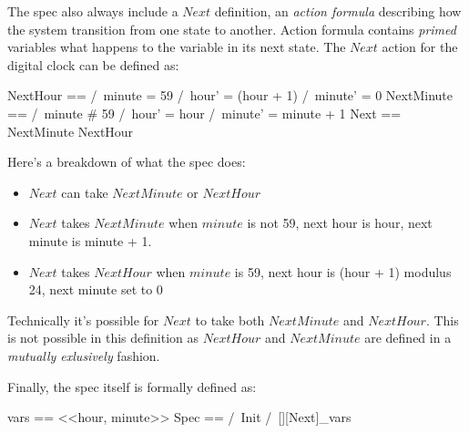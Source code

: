 \documentclass{report}
\begin{document}
The spec also always include a $Next$ definition, an \textit{action formula}
describing how the system transition from one state to another. Action formula
contains \textit{primed} variables what happens to the variable in its next
state. The $Next$ action for the digital clock can be defined as:\newline

\begin{tla}
    NextHour ==
        /\ minute = 59 
        /\ hour' = (hour + 1) %
        /\ minute' = 0
    NextMinute == 
        /\ minute # 59
        /\ hour' = hour 
        /\ minute' = minute + 1 
    Next ==
        \/ NextMinute
        \/ NextHour
\end{tla}
\begin{tlatex}
%
%
%
%
%
%
%
%
%
%
%
\end{tlatex}
 \newline

Here's a breakdown of what the spec does:
\begin{itemize}
    \item $Next$ can take $NextMinute$ or $NextHour$
    \item $Next$ takes $NextMinute$ when $minute$ is not 59, next hour is hour, next minute is minute + 1. 
    \item $Next$ takes $NextHour$ when $minute$ is 59, next hour is (hour + 1) modulus 24, next minute set to 0
\end{itemize}

Technically it's possible for $Next$ to take both $NextMinute$ and $NextHour$.
This is not possible in this definition as $NextHour$ and $NextMinute$ are
defined in a \textit{mutually exlusively} fashion.\newline

Finally, the spec itself is formally defined as:\newline
\begin{tla}
    vars == <<hour, minute>>
    Spec ==
        /\ Init
        /\ [][Next]_vars
\end{tla}
\begin{tlatex}
%
%
%
%
\end{tlatex}
\newline
\end{document}
